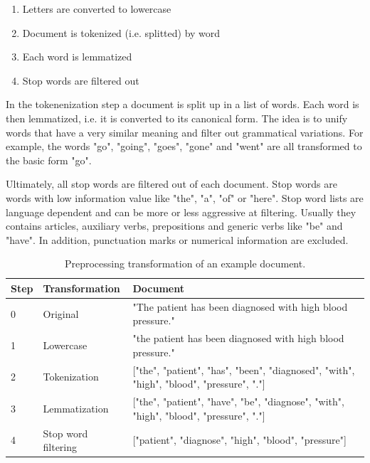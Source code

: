 \begin{enumerate} 
	\item Letters are converted to lowercase
	\item Document is tokenized (i.e. splitted) by word
	\item Each word is lemmatized
	\item Stop words are filtered out
\end{enumerate}

In the tokenenization step a document is split up in a list of words.
Each word is then lemmatized, i.e. it is converted to its canonical form.
The idea is to unify words that have a very similar meaning and filter out grammatical variations.
For example, the words  "go", "going", "goes", "gone" and "went" are all transformed to the basic form "go".

Ultimately, all stop words are filtered out of each document.
Stop words are words with low information value like "the", "a", "of" or "here".
Stop word lists are language dependent and can be more or less aggressive at filtering.
Usually they contains articles, auxiliary verbs, prepositions and generic verbs like "be" and "have".
In addition, punctuation marks or numerical information are excluded.

\begin{table}[!htbp]
	\begin{tabularx}{\textwidth}{l l p{9.8cm}}
		\toprule
		\textbf{Step} & \textbf{Transformation} & \textbf{Document}                                                       \\ \midrule
		0             & Original       & "The patient has been diagnosed with high blood pressure." \\
		1             & Lowercase               & "the patient has been diagnosed with high blood pressure." \\
		2 & Tokenization  & {[}"the", "patient", "has", "been", "diagnosed", "with", "high", "blood", "pressure", "."{]} \\
		3 & Lemmatization & {[}"the", "patient", "have", "be", "diagnose", "with", "high", "blood", "pressure", "."{]}   \\
		4             & Stop word filtering     & {[}"patient", "diagnose", "high", "blood", "pressure"{]} \\ \bottomrule
	\end{tabularx}
	\caption{Preprocessing transformation of an example document.}
	\label{tab:text-preprocessing}
\end{table}


